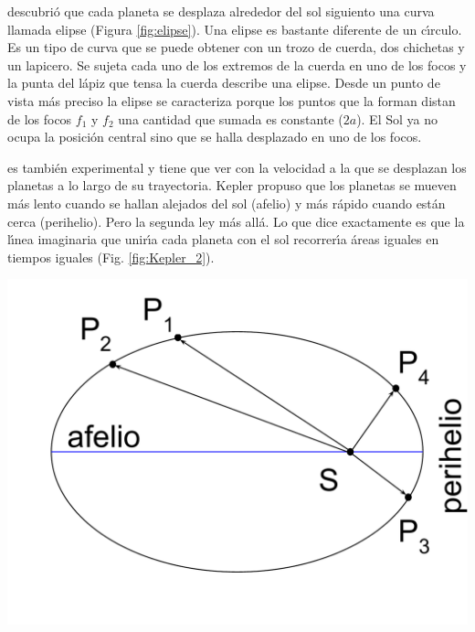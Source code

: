  

 descubri\'o que cada planeta se desplaza alrededor del sol siguiento una curva llamada elipse (Figura \ref{fig:elipse}). Una elipse es bastante diferente de un c\'\i{}rculo. Es un tipo de curva que se puede obtener con un trozo de cuerda, dos chichetas y un lapicero. Se sujeta cada uno de los extremos de la cuerda en uno de los focos y la punta del l\'apiz que tensa la cuerda describe una elipse. Desde un punto de vista m\'as preciso la elipse se caracteriza porque los puntos que la forman distan de los focos $f_1$ y $f_2$ una cantidad que sumada es constante ($2a$).  El Sol ya no ocupa la posici\'on central sino que se halla desplazado en uno de los focos.


 es tambi\'en experimental y tiene que ver con la velocidad a la que se desplazan los planetas a lo largo de su trayectoria. Kepler propuso que los planetas se mueven m\'as lento cuando se hallan alejados del sol (afelio) y m\'as r\'apido cuando est\'an cerca (perihelio). Pero la segunda ley m\'as all\'a. Lo que dice exactamente es que la l\'\i{}nea imaginaria que unir\'\i{}a cada planeta con el sol recorrer\'\i{}a \'areas iguales en tiempos iguales (Fig. \ref{fig:Kepler_2}). 

\begin{marginfigure}
  \includegraphics[width=\linewidth]{Kepler_2.pdf}
  \caption{Representaci\'on moderna de la segunda Ley de Kepler. El radio vector que une Sol (S) con el planeta (P) recorre \'areas iguales en tiempos iguales ($SP_1P_2=SP_3P_4$). Como consecuencia la velocidad del planeta es mayor en el perihelio que en el afelio.}
  \label{fig:Kepler_2}
\end{marginfigure}

